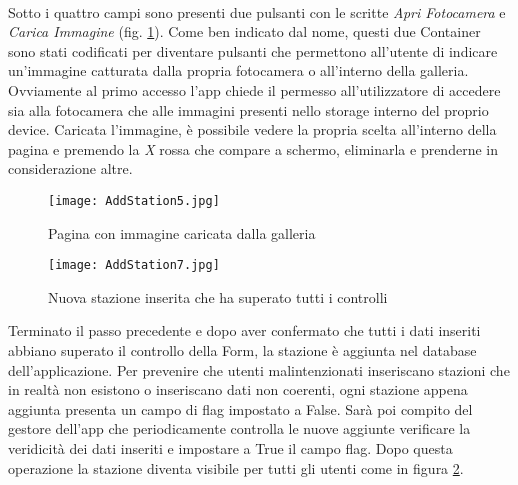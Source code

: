 \\
Sotto i quattro campi sono presenti due pulsanti con le scritte \textit{Apri
Fotocamera} e \textit{Carica Immagine} (fig. \ref{addStation5}). Come ben indicato dal nome, questi due
Container sono stati codificati per diventare pulsanti che permettono
all'utente di indicare un'immagine catturata dalla propria fotocamera o
all'interno 
della galleria. Ovviamente al primo accesso l'app chiede il permesso
all'utilizzatore di accedere sia alla fotocamera che alle immagini presenti nello storage
interno del proprio device. Caricata l'immagine, è possibile vedere la propria
scelta all'interno della pagina e premendo la \textit{X} rossa che compare a schermo,
eliminarla e prenderne in considerazione altre.
\begin{figure}
    \centering
    \texttt{[image: AddStation5.jpg]}
    \caption{Pagina con immagine caricata dalla galleria}
    \label{addStation5}
\end{figure}
\begin{figure}[!h]
    \centering
    \texttt{[image: AddStation7.jpg]}
    \caption{Nuova stazione inserita che ha superato tutti i controlli}
    \label{addStation7}
\end{figure}
Terminato il passo precedente e dopo aver confermato che tutti i dati inseriti
abbiano superato il controllo della Form, la stazione è aggiunta nel database
dell'applicazione. Per prevenire che utenti malintenzionati inseriscano stazioni
che in realtà non esistono o inseriscano dati non coerenti, ogni stazione appena
aggiunta presenta un campo di flag impostato a False. Sarà poi compito del gestore
dell'app che periodicamente controlla le nuove aggiunte verificare la
veridicità dei dati inseriti e impostare a True il campo flag. Dopo questa
operazione la stazione diventa visibile per tutti gli utenti come in figura
\ref{addStation7}.

